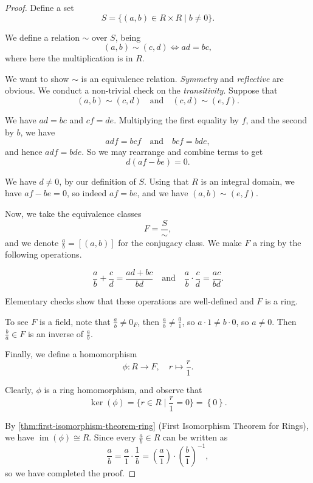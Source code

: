 \documentclass{article}
\theoremstyle{definition}
\theoremstyle{remark}
\newcommand{\pqty}[1]{\left(#1\right)}
\newcommand{\bqty}[1]{\left[#1\right]}
\newcommand{\Bqty}[1]{\left\{#1\right\}}
\newcommand{\set}[2]{\{#1\mid #2\}}
\newcommand{\flatfrac}[2]{\frac{#1}{#2}}
\newcommand{\function}[5]{#1:#2\to #3,\quad #4\mapsto #5}
\newcommand{\qand}{\quad\text{and}\quad}
\newcommand{\inverse}{^{-1}}
\newcommand{\isomorphic}{\cong}
\newcommand{\img}{\operatorname{im}}
\begin{document}
\begin{proof}
    Define a set
    \[
        S = \set{\pqty{a, b} \in R \times R}{b \neq 0}.
    \]

    We define a relation \(\sim\) over \(S\), being
    \[
        \pqty{a, b} \sim \pqty{c, d} \iff ad = bc,
    \]
    where here the multiplication is in \(R\).

    We want to show \(\sim\) is an equivalence relation. \emph{Symmetry} and \emph{reflective} are obvious. We conduct a non-trivial check on the \emph{transitivity}. Suppose that
    \[
        \pqty{a, b} \sim \pqty{c, d} \qand \pqty{c, d} \sim \pqty{e, f}.
    \]

    We have \(ad = bc\) and \(cf = de\). Multiplying the first equality by \(f\), and the second by \(b\), we have
    \[
        adf = bcf \qand bcf = bde,
    \]
    and hence \(adf = bde\). So we may rearrange and combine terms to get
    \[
        d \pqty{af - be} = 0.
    \]

    We have \(d \neq 0\), by our definition of \(S\). Using that \(R\) is an integral domain, we have \(af - be = 0\), so indeed \(af = be\), and we have \(\pqty{a, b} \sim \pqty{e, f}\).

    Now, we take the equivalence classes
    \[
        F = \flatfrac{S}{\sim},
    \]
    and we denote \(\frac{a}{b} = \bqty{\pqty{a, b}}\) for the conjugacy class. We make \(F\) a ring by the following operations.

    \[
        \frac{a}{b} + \frac{c}{d} = \frac{ad + bc}{bd} \qand \frac{a}{b} \cdot \frac{c}{d} = \frac{ac}{bd}.
    \]

    Elementary checks show that these operations are well-defined and \(F\) is a ring.

    To see \(F\) is a field, note that \(\frac{a}{b} \neq 0_F\), then \(\frac{a}{b} \neq \frac{0}{1}\), so \(a \cdot 1 \neq b \cdot 0\), so \(a \neq 0\). Then \(\frac{b}{a} \in F\) is an inverse of \(\frac{a}{b}\).

    Finally, we define a homomorphism
    \[
        \function{\phi}{R}{F}{r}{\frac{r}{1}.}
    \]

    Clearly, \(\phi\) is a ring homomorphism, and observe that
    \[
        \ker\pqty{\phi} = \set{r \in R}{\frac{r}{1} = 0} = \Bqty{0}.
    \]

    By \autoref{thm:first-isomorphism-theorem-ring} (First Isomorphism Theorem for Rings), we have \(\img \pqty{\phi} \isomorphic R\). Since every \(\frac{a}{b} \in R\) can be written as
    \[
        \frac{a}{b} = \frac{a}{1} \cdot \frac{1}{b} = \pqty{\frac{a}{1}} \cdot \pqty{\frac{b}{1}}\inverse, 
    \]
    so we have completed the proof.
\end{proof}
\end{document}
